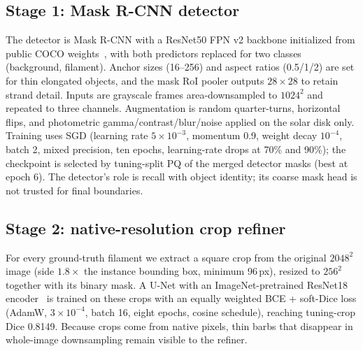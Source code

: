 \documentclass[sigconf]{acmart}
\begin{document}
\subsection{Stage 1: Mask R-CNN detector}
The detector is Mask R-CNN with a ResNet50 FPN v2 backbone initialized from public COCO weights~\cite{he2017maskrcnn}, with both predictors replaced for two classes (background, filament). Anchor sizes (16--256) and aspect ratios (0.5/1/2) are set for thin elongated objects, and the mask RoI pooler outputs $28\times28$ to retain strand detail. Inputs are grayscale frames area-downsampled to $1024^2$ and repeated to three channels. Augmentation is random quarter-turns, horizontal flips, and photometric gamma/contrast/blur/noise applied on the solar disk only. Training uses SGD (learning rate $5\times10^{-3}$, momentum 0.9, weight decay $10^{-4}$, batch 2, mixed precision, ten epochs, learning-rate drops at 70\% and 90\%); the checkpoint is selected by tuning-split PQ of the merged detector masks (best at epoch 6). The detector's role is recall with object identity; its coarse mask head is not trusted for final boundaries.

\subsection{Stage 2: native-resolution crop refiner}
For every ground-truth filament we extract a square crop from the original $2048^2$ image (side $1.8\times$ the instance bounding box, minimum 96\,px), resized to $256^2$ together with its binary mask. A U-Net with an ImageNet-pretrained ResNet18 encoder~\cite{he2016resnet} is trained on these crops with an equally weighted BCE + soft-Dice loss (AdamW, $3\times10^{-4}$, batch 16, eight epochs, cosine schedule), reaching tuning-crop Dice 0.8149. Because crops come from native pixels, thin barbs that disappear in whole-image downsampling remain visible to the refiner.
\end{document}
